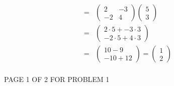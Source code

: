 \documentclass[12pt]{article}
\newenvironment{problem}[2][Problem]
{
	\begin{trivlist} 
		\item[\hskip \labelsep {\bfseries #1 #2:}]
	}
{
	\end{trivlist}
	}
\newenvironment{solution}[1][Solution]
{
	\begin{trivlist} 
		\item[\hskip \labelsep {\itshape #1:}]
	}
	{
	\end{trivlist}
}
\begin{document}
\begin{problem}{1}
\begin{solution}
\begin{align*}
=& \begin{pmatrix} 2 & -3 \\-2 & 4 \end{pmatrix} \begin{pmatrix}5\\3\end{pmatrix}&\\
=& \begin{pmatrix} 2\cdot 5 + -3\cdot 3 \\-2\cdot 5 + 4\cdot 3\end{pmatrix}&\\
=& \begin{pmatrix} 10 -9 \\-10 +12\end{pmatrix} =  \begin{pmatrix} 1 \\2\end{pmatrix}&\\
\end{align*}
\vfill
\centerline{PAGE 1 OF 2 FOR PROBLEM 1}
\end{solution}
\end{problem}
\end{document}
